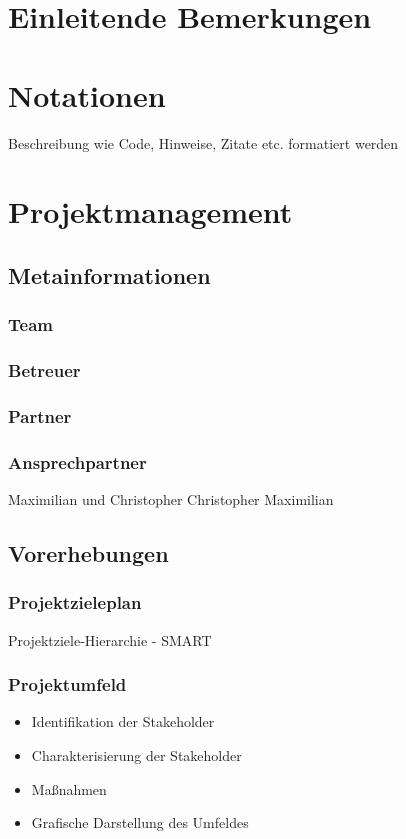 \def \currentAuthor {Gabi Sorglos} %

\chapter*{Einleitende Bemerkungen}

\chapter*{Notationen}
Beschreibung wie Code, Hinweise, Zitate etc. formatiert werden  

\chapter{Projektmanagement}

\section{Metainformationen}
\subsection{Team}


\subsection{Betreuer}
\subsection{Partner}
\subsection{Ansprechpartner}
Maximilian und Christopher
Christopher  Maximilian
\section{Vorerhebungen}
\subsection{Projektzieleplan}
Projektziele-Hierarchie - SMART
\subsection{Projektumfeld}
\begin{itemize}
	\item Identifikation der Stakeholder
	\item Charakterisierung der Stakeholder
	\item Maßnahmen
	\item Grafische Darstellung des Umfeldes
\end{itemize}
